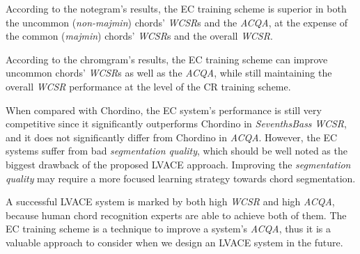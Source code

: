 According to the notegram's results, the EC training scheme is superior in both the uncommon (\textit{non-majmin}) chords' \textit{WCSR}s and the \textit{ACQA}, at the expense of the common (\textit{majmin}) chords' \textit{WCSR}s and the overall \textit{WCSR}.

According to the chromgram's results, the EC training scheme can improve uncommon chords' \textit{WCSR}s as well as the \textit{ACQA}, while still maintaining the overall \textit{WCSR} performance at the level of the CR training scheme.

When compared with Chordino, the EC system's performance is still very competitive since it significantly outperforms Chordino in \textit{SeventhsBass} \textit{WCSR}, and it does not significantly differ from Chordino in \textit{ACQA}. However, the EC systems suffer from bad \textit{segmentation quality}, which should be well noted as the biggest drawback of the proposed LVACE approach. Improving the \textit{segmentation quality} may require a more focused learning strategy towards chord segmentation.

A successful LVACE system is marked by both high \textit{WCSR} and high \textit{ACQA}, because human chord recognition experts are able to achieve both of them. The EC training scheme is a technique to improve a system's \textit{ACQA}, thus it is a valuable approach to consider when we design an LVACE system in the future.

